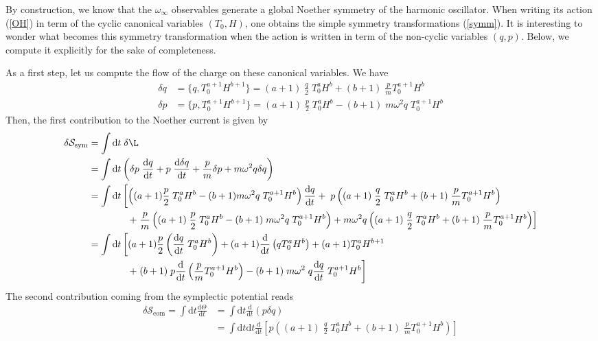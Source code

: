 \documentclass[onecolumn,notitlepage,superscriptaddress, nofootinbib,nobibnotes, aps,prd,10pt]{revtex4-1}%
\def\S{\mathcal{S}}
\def\nn{\nonumber}
\def\dd{\mathrm{d}}
\begin{document}
\label{OHflow}
By construction, we know that the $\omega_{\infty}$ observables generate a global Noether symmetry of the harmonic oscillator. When writing its action (\ref{OH}) in term of the cyclic canonical variables $(T_0, H)$, one obtains the simple symmetry transformations (\ref{symm}).
It is interesting to wonder what becomes this symmetry transformation when the action is written in term of the non-cyclic variables $(q,p)$. Below, we compute it explicitly for the sake of completeness. 

As a first step, let us compute the flow of the charge on these canonical variables. We have
\begin{align}
\label{qtrans}
\delta q & = \{ q, T^{a+1}_0 H^{b+1}\} = (a+1) \; \frac{q}{2} \; T^a_0 H^{b}  + (b+1) \; \frac{p}{m} T^{a+1}_0 H^b\\
\label{ptrans}
\delta p & = \{ p, T^{a+1}_0 H^{b+1}\} = (a+1) \; \frac{p}{2}\; T^a_0 H^b - (b+1) \; m \omega^2 q \; T^{a+1}_0 H^b
\end{align}
Then, the first contribution to the Noether current is given by
\begin{align}
\delta \S_{\text{sym}} & = \int \dd t \; \delta \L \\
& =    \int \dd t \left( \delta p \;  \frac{\dd q}{\dd t} + p \; \frac{\dd \delta q}{\dd t} + \frac{p}{m} \delta p + m \omega^2 q \delta q\right) \\
& = \int \dd t \left[ \left( (a+1) \frac{p}{2} \; T^a_0 H^b - (b+1) m \omega^2 q \; T^{a+1}_0 H^b \right) \frac{\dd q}{\dd t} + \; p \left( (a+1) \; \frac{q}{2} \; T^a_0 H^{b}  + (b+1) \; \frac{p}{m} T^{a+1}_0 H^b \right)  \right. \nn \\
& \left. \qquad \qquad + \; \frac{p}{m} \left( (a+1) \; \frac{p}{2}\; T^a_0 H^b - (b+1) \; m \omega^2 q \; T^{a+1}_0 H^b \right) + m \omega^2 q \left( (a+1) \; \frac{q}{2} \; T^a_0 H^{b}  + (b+1) \; \frac{p}{m} T^{a+1}_0 H^b \right)\right] \\
& = \int \dd t \left[ (a+1) \frac{p}{2} \left( \frac{\dd q}{\dd t} \; T^a_0 H^b\right) + (a+1)\frac{\dd }{\dd t} \left( q T^a_0 H^b\right) + (a+1) T^a_0 H^{b+1} \right. \\
& \qquad \qquad  \left. +\;  (b+1) \; p \frac{\dd}{\dd t} \left( \frac{p}{m} T^{a+1}_0 H^b \right) - (b+1) \; m \omega^2 \; q \frac{\dd q}{\dd t} \; T^{a+1}_0 H^b \right]
\end{align}
The second contribution coming from the symplectic potential reads
\begin{align}
\delta \S_{\text{eom}} = \int \dd t \frac{\dd \Theta}{\dd t} & = \int \dd t \frac{\dd}{\dd t} \left( p \delta q\right) \\
& = \int \dd t \dd t \frac{\dd}{\dd t} \left[  p \left( (a+1) \; \frac{q}{2} \; T^a_0 H^{b}  + (b+1) \; \frac{p}{m} T^{a+1}_0 H^b \right) \right] 
\end{align}
\end{document}
